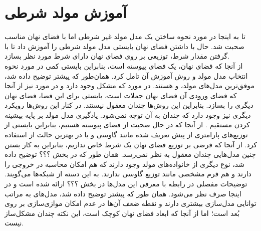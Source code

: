 \section{آموزش مولد شرطی}
تا به اینجا در مورد نحوه ساختن یک مدل مولد غیر شرطی اما با فضای نهان مناسب صحبت شد. حال با داشتن فضای نهان بایستی مدل مولد شرطی را آموزش داد تا با گرفتن مقدار شرط، توزیعی بر روی فضای نهان دارای شرط مورد نظر بسازد.
\\
از آنجا که فضای نهان، یک فضای پیوسته است، بنابراین بایستی کمی در مورد نحوه انتخاب مدل مولد و روش آموزش آن تامل کرد. همان‌طور که پیشتر توضیح داده شد، موفق‌ترین مدل‌های مولد، \gan{} و \vae{} هستند. در مورد \gan{} که مشکل \modecollapse{} وجود دارد و در مورد \vae{} نیز از آنجا که فضای ورودی آن فضای نهان جملات است، بایستی برای این فضا، فضای نهان دیگری را بسازد. بنابراین این روش‌ها چندان معقول نیستند. در کنار این روش‌ها رویکرد دیگری نیز وجود دارد که چندان به آن توجه نمی‌شود. یادگیری مدل مولد بر پایه بیشینه کردن مستقیم \likelihood{}. از آنجا که در حال صحبت از فضای پیوسته هستیم، بنابراین بایستی از توزیع‌های پارامتری از پیش تعریف شده مانند گاوسی و یا در بهترین حالت از 
استفاده کرد. از آنجا که فرضی بر توزیع فضای نهان یک شرط خاص نداریم، بنابراین به کار بستن چنین مدل‌هایی چندان معقول به نظر نمی‌رسد. همان طور که در بخش ؟؟؟‌ توضیح داده شد، نوع دیگری از خانواده‌های مولد وجود دارند که هم امکان محاسبه \likelihood{} در خروجی را دارند و هم فرم مشخصی مانند توزیع گاوسی ندارند. به این دسته از شبکه‌ها \normalizingflownets{} می‌گویند. توضیحات مفصلی در رابطه با معرفی این مدل‌ها در بخش ؟؟؟ ارائه شده است و در اینجا صرف نظر می‌شود. همان طور که پیشتر توضیح داده شد، مدل‌های \autoregressive{} به مراتب توانایی مدل‌سازی بیشتری دارند و نقطه ضعف آن‌ها در عدم امکان موازی‌سازی بر روی بُعد است؛ اما از آنجا که ابعاد فضای نهان کوچک است، این نکته چندان مشکل‌ساز نیست.

